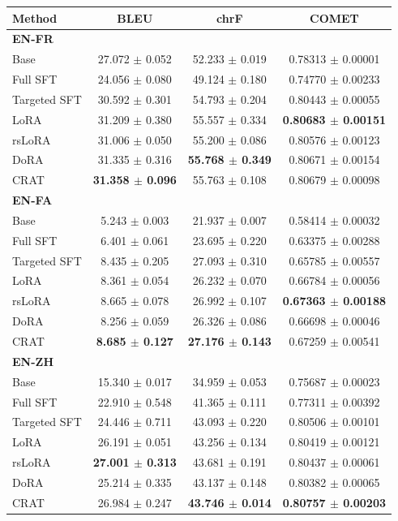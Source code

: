 \begingroup
\fontsize{7}{8.4}\selectfont
\setlength{\tabcolsep}{3pt}
\begin{tabular}{lccc}
\toprule
\textbf{Method} & \textbf{BLEU} & \textbf{chrF} & \textbf{COMET} \\
\midrule
\multicolumn{4}{l}{\textbf{EN-FR}} \\
Base & 27.072 $\pm$ 0.052 & 52.233 $\pm$ 0.019 & 0.78313 $\pm$ 0.00001 \\
Full SFT & 24.056 $\pm$ 0.080 & 49.124 $\pm$ 0.180 & 0.74770 $\pm$ 0.00233 \\
Targeted SFT & 30.592 $\pm$ 0.301 & 54.793 $\pm$ 0.204 & 0.80443 $\pm$ 0.00055 \\
LoRA & 31.209 $\pm$ 0.380 & 55.557 $\pm$ 0.334 & \textbf{0.80683 $\pm$ 0.00151} \\
rsLoRA & 31.006 $\pm$ 0.050 & 55.200 $\pm$ 0.086 & 0.80576 $\pm$ 0.00123 \\
DoRA & 31.335 $\pm$ 0.316 & \textbf{55.768 $\pm$ 0.349} & 0.80671 $\pm$ 0.00154 \\
CRAT & \textbf{31.358 $\pm$ 0.096} & 55.763 $\pm$ 0.108 & 0.80679 $\pm$ 0.00098 \\
\multicolumn{4}{l}{\textbf{EN-FA}} \\
Base & 5.243 $\pm$ 0.003 & 21.937 $\pm$ 0.007 & 0.58414 $\pm$ 0.00032 \\
Full SFT & 6.401 $\pm$ 0.061 & 23.695 $\pm$ 0.220 & 0.63375 $\pm$ 0.00288 \\
Targeted SFT & 8.435 $\pm$ 0.205 & 27.093 $\pm$ 0.310 & 0.65785 $\pm$ 0.00557 \\
LoRA & 8.361 $\pm$ 0.054 & 26.232 $\pm$ 0.070 & 0.66784 $\pm$ 0.00056 \\
rsLoRA & 8.665 $\pm$ 0.078 & 26.992 $\pm$ 0.107 & \textbf{0.67363 $\pm$ 0.00188} \\
DoRA & 8.256 $\pm$ 0.059 & 26.326 $\pm$ 0.086 & 0.66698 $\pm$ 0.00046 \\
CRAT & \textbf{8.685 $\pm$ 0.127} & \textbf{27.176 $\pm$ 0.143} & 0.67259 $\pm$ 0.00541 \\
\multicolumn{4}{l}{\textbf{EN-ZH}} \\
Base & 15.340 $\pm$ 0.017 & 34.959 $\pm$ 0.053 & 0.75687 $\pm$ 0.00023 \\
Full SFT & 22.910 $\pm$ 0.548 & 41.365 $\pm$ 0.111 & 0.77311 $\pm$ 0.00392 \\
Targeted SFT & 24.446 $\pm$ 0.711 & 43.093 $\pm$ 0.220 & 0.80506 $\pm$ 0.00101 \\
LoRA & 26.191 $\pm$ 0.051 & 43.256 $\pm$ 0.134 & 0.80419 $\pm$ 0.00121 \\
rsLoRA & \textbf{27.001 $\pm$ 0.313} & 43.681 $\pm$ 0.191 & 0.80437 $\pm$ 0.00061 \\
DoRA & 25.214 $\pm$ 0.335 & 43.137 $\pm$ 0.148 & 0.80382 $\pm$ 0.00065 \\
CRAT & 26.984 $\pm$ 0.247 & \textbf{43.746 $\pm$ 0.014} & \textbf{0.80757 $\pm$ 0.00203} \\
\bottomrule
\end{tabular}
\endgroup
